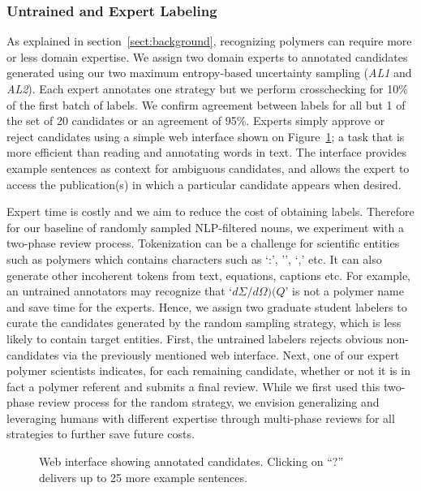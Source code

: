\subsubsection{Untrained and Expert Labeling}
As explained in section~\ref{sect:background}, recognizing polymers can require more or less domain expertise.
We assign two domain experts to annotated candidates generated using our two maximum entropy-based uncertainty sampling (\textit{AL1} and \textit{AL2}). 
Each expert annotates one strategy but we perform crosschecking for 10\% of the first batch of labels. We confirm agreement between labels for all but 1 of the set of 20 candidates or an agreement of 95\%.
Experts simply approve or reject candidates using a simple web interface shown on Figure~\ref{fig:polyner}; a task that is more efficient than reading and annotating words in text.
The interface
provides example sentences as context for ambiguous candidates,
and allows the expert to access the publication(s) in which a particular candidate
appears when desired.

Expert time is costly and we aim to reduce the cost of obtaining labels.
Therefore for our baseline of randomly sampled NLP-filtered nouns, we experiment with a two-phase review process.
Tokenization can be a challenge for scientific entities such as polymers which contains characters such as `:', '\textendash', `,' etc. It can also generate other incoherent tokens from text, equations, captions etc.
For example, an untrained annotators may recognize that `$d\Sigma/d\Omega)(Q$' is not a polymer name and save time for the experts.
Hence, we assign two graduate student labelers to curate the candidates generated by the random sampling strategy, which is less likely to contain target entities.
First, the untrained labelers rejects obvious non-candidates via the previously mentioned web interface. 
Next, one of our expert polymer scientists indicates, for each remaining
candidate, whether or not it is in fact a polymer referent and submits a final review.
While we first used this two-phase review process for the random strategy, we envision generalizing and leveraging humans with different expertise through multi-phase reviews for all strategies to further save future costs.


\begin{figure}
\centering
{}
\caption{\label{fig:polyner} Web interface showing annotated candidates.
Clicking on ``?'' delivers up to 25 more example sentences.
}
\end{figure}

